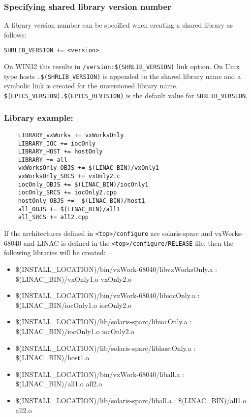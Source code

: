 \subsubsection{Specifying shared library version number}

A library version number can be specified when creating a shared library as follows:

\begin{description}

\item {}\verb|SHRLIB_VERSION += <version>|

\end{description}

On WIN32 this results in \verb|/version:$(SHRLIB_VERSION)| link option. On Unix type hosts \verb|.$(SHRLIB_VERSION)| is 
appended to the shared library name and a symbolic link is created for the unversioned library name. \\
\verb|$(EPICS_VERSION).$(EPICS_REVISION)| is the default value for \verb|SHRLIB_VERSION|.

\subsubsection{Library example:}


\begin{verbatim}
    LIBRARY_vxWorks += vxWorksOnly
    LIBRARY_IOC += iocOnly
    LIBRARY_HOST += hostOnly
    LIBRARY += all
    vxWorksOnly_OBJS += $(LINAC_BIN)/vxOnly1
    vxWorksOnly_SRCS += vxOnly2.c
    iocOnly_OBJS += $(LINAC_BIN)/iocOnly1
    iocOnly_SRCS += iocOnly2.cpp
    hostOnly_OBJS +=  $(LINAC_BIN)/host1
    all_OBJS += $(LINAC_BIN)/all1
    all_SRCS += all2.cpp
\end{verbatim}
If the architectures defined in \verb|<top>/configure| are solaris-sparc and vxWorks-68040 and LINAC is defined in the \verb|<top>/configure/RELEASE| file, then the following libraries will be created:

\begin{itemize}
\item \$(INSTALL\_LOCATION)/bin/vxWork-68040/libvxWorksOnly.a : \$(LINAC\_BIN)/vxOnly1.o vxOnly2.o

\item \$(INSTALL\_LOCATION)/bin/vxWork-68040/libiocOnly.a : \$(LINAC\_BIN/iocOnly1.o iocOnly2.o

\item \$(INSTALL\_LOCATION)/lib/solaris-sparc/libiocOnly.a : \$(LINAC\_BIN)/iocOnly1.o iocOnly2.o

\item \$(INSTALL\_LOCATION)/lib/solaris-sparc/libhostOnly.a : \$(LINAC\_BIN)/host1.o

\item \$(INSTALL\_LOCATION)/bin/vxWork-68040/liball.a : \$(LINAC\_BIN)/all1.o all2.o

\item \$(INSTALL\_LOCATION)/lib/solaris-sparc/liball.a : \$(LINAC\_BIN)/all1.o all2.o

\end{itemize}

